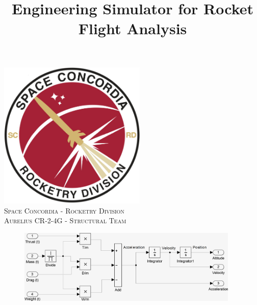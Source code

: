 \documentclass[]{book}
\title{Engineering Simulator for Rocket Flight Analysis}
\date{}
\begin{document}

%
%
\begin{titlepage}

\newcommand{\HRule}{\rule{\linewidth}{0.5mm}} %

\center %
 

\includegraphics[width=200pt,height=200pt]{../images/rocketry_logo_large.png}\\[1cm] %
\textsc{\Large Space Concordia - Rocketry Division}\\[0.5cm] %
\textsc{\large Aurelius CR-2-4G - Structural Team}\\[0.5cm] %


\begin{figure}[ht]
    \centering
    \includegraphics[height=100pt]{../images/vertical_model_simplified.png}\\
\end{figure}


\end{titlepage}
\end{document}
